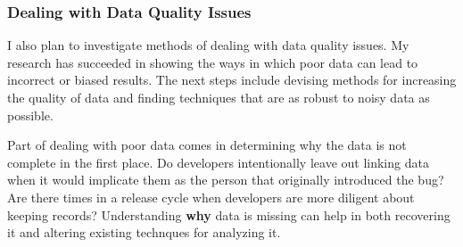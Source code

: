 \documentclass[10pt]{article}
\newcommand\Subsection[1]{\subsubsection*{\small #1}}
\begin{document}
\begin{small}
\Subsection{Dealing with Data Quality Issues}

I also plan to investigate methods of dealing with data quality issues.  My
research has succeeded in showing the ways in which poor data can lead to
incorrect or biased results.  The next steps include devising methods for
increasing the quality of data and finding techniques that are as robust to
noisy data as possible.

Part of dealing with poor data comes in determining why the data is not complete
in the first place.  Do developers intentionally leave out linking data when it would
implicate them as the person that originally introduced the bug?  Are there times
in a release cycle when developers are more diligent about keeping records?  Understanding
\textbf{why} data is missing can help in both recovering it and altering existing technques
for analyzing it.

\vspace{0.5cm}

\end{small}

\begin{footnotesize}

%
%

\end{footnotesize}
\end{document}

